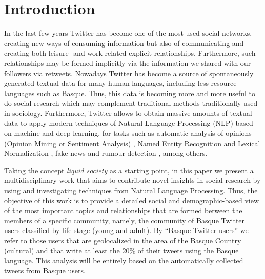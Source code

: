 \documentclass[information,article,submit,moreauthors,pdftex,10pt,a4paper]{Definitions/mdpi}
\begin{document}


\section{Introduction}\label{sec:introduction}


In the last few years Twitter has become one of the most used social networks, creating new ways of consuming information but also of communicating and creating both leisure- and work-related explicit relationships. Furthermore, such relationships may be formed implicitly via the information we shared with our followers via retweets. Nowadays Twitter has become a source of spontaneously generated textual data for many human languages, including less resource languages such as Basque. Thus, this data is becoming more and more useful to do social research \cite{nguyen2016computational,rosenthal2017semeval,baldwin2015shared} which may complement traditional methods traditionally used in sociology. Furthermore, Twitter allows to obtain massive amounts of textual data to apply modern techniques of Natural Language Processing (NLP) based on machine and deep learning, for tasks such as automatic analysis of opinions (Opinion Mining or Sentiment Analysis) \cite{rosenthal2017semeval,S16-1003}, Named Entity Recognition and Lexical Normalization \cite{baldwin2015shared}, fake news and rumour detection \cite{derczynski2017semeval}, among others.

Taking the concept \emph{liquid society} \cite{bauman2013liquid} as a starting point, in this paper we present a multidisciplinary work that aims to contribute novel insights in social research by using and investigating techniques from Natural Language Processing. Thus, the objective of this work is to provide a detailed social and demographic-based view of the most important topics and relationships that are formed between the members of a specific community, namely, the community of Basque Twitter users classified by life stage (young and adult). By ``Basque Twitter users'' we refer to those users that are geolocalized in the area of the Basque Country (cultural) and that write at least the 20\% of their tweets using the Basque language. This analysis will be entirely based on the automatically collected tweets from Basque users.
\end{document}
